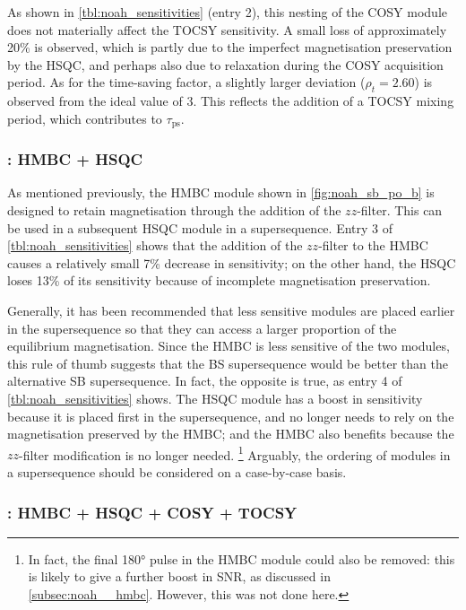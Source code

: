 As shown in \cref{tbl:noah_sensitivities} (entry 2), this nesting of the COSY module does not materially affect the TOCSY sensitivity.
A small loss of approximately 20\% is observed, which is partly due to the imperfect magnetisation preservation by the HSQC, and perhaps also due to relaxation during the COSY acquisition period.
As for the time-saving factor, a slightly larger deviation ($\rho_t = 2.60$) is observed from the ideal value of $3$.
This reflects the addition of a TOCSY mixing period, which contributes to $\tau_\text{ps}$.

\subsubsection{: HMBC + HSQC}

As mentioned previously, the HMBC module shown in \cref{fig:noah_sb_po_b} is designed to retain  magnetisation through the addition of the $zz$-filter.
This can be used in a subsequent HSQC module in a  supersequence.
Entry 3 of \cref{tbl:noah_sensitivities} shows that the addition of the $zz$-filter to the HMBC causes a relatively small 7\% decrease in sensitivity; on the other hand, the HSQC loses 13\% of its sensitivity because of incomplete magnetisation preservation.

Generally, it has been recommended that less sensitive modules are placed earlier in the supersequence so that they can access a larger proportion of the equilibrium magnetisation.
Since the HMBC is less sensitive of the two modules, this rule of thumb suggests that the BS supersequence would be better than the alternative SB supersequence.
In fact, the opposite is true, as entry 4 of \cref{tbl:noah_sensitivities} shows.
The HSQC module has a boost in sensitivity because it is placed first in the supersequence, and no longer needs to rely on the  magnetisation preserved by the HMBC; and the HMBC also benefits because the $zz$-filter modification is no longer needed.%
\footnote{In fact, the final \ang{180} pulse in the HMBC module could also be removed: this is likely to give a further boost in SNR, as discussed in \cref{subsec:noah__hmbc}. However, this was not done here.}
Arguably, the ordering of modules in a supersequence should be considered on a case-by-case basis.

\subsubsection{: HMBC + HSQC + COSY + TOCSY}

